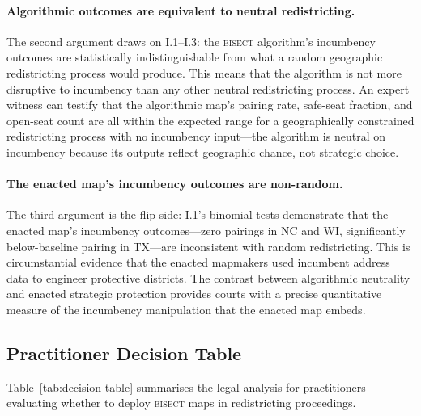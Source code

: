 \paragraph{Algorithmic outcomes are equivalent to neutral redistricting.}
The second argument draws on I.1--I.3: the \textsc{bisect} algorithm's incumbency
outcomes are statistically indistinguishable from what a random geographic redistricting
process would produce. This means that the algorithm is not more disruptive to incumbency
than any other neutral redistricting process. An expert witness can testify that the
algorithmic map's pairing rate, safe-seat fraction, and open-seat count are all within
the expected range for a geographically constrained redistricting process with no
incumbency input---the algorithm is neutral on incumbency because its outputs reflect
geographic chance, not strategic choice.

\paragraph{The enacted map's incumbency outcomes are non-random.}
The third argument is the flip side: I.1's binomial tests demonstrate that the enacted
map's incumbency outcomes---zero pairings in NC and WI, significantly below-baseline
pairing in TX---are inconsistent with random redistricting. This is circumstantial
evidence that the enacted mapmakers used incumbent address data to engineer protective
districts. The contrast between algorithmic neutrality and enacted strategic protection
provides courts with a precise quantitative measure of the incumbency manipulation
that the enacted map embeds.

\subsection{Practitioner Decision Table}

Table~\ref{tab:decision-table} summarises the legal analysis for practitioners
evaluating whether to deploy \textsc{bisect} maps in redistricting proceedings.

